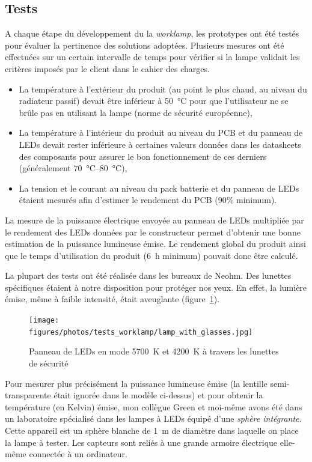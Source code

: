 \documentclass[a4paper, 12pt, sffamily]{report}
\begin{document}
\subsection{Tests}
A chaque étape du développement du la \emph{worklamp}, les prototypes ont été testés pour évaluer la pertinence des solutions adoptées. Plusieurs mesures ont été effectuées sur un certain intervalle de temps pour vérifier si la lampe validait les critères imposés par le client dans le cahier des charges.
\begin{itemize} %
\item La température à l'extérieur du produit (au point le plus chaud, au niveau du radiateur passif) devait être inférieur à \SI{50}{\celsius} pour que l'utilisateur ne se brûle pas en utilisant la lampe (norme de sécurité européenne),
\item La température à l'intérieur du produit au niveau du PCB et du panneau de LEDs devait rester inférieure à certaines valeurs données dans les datasheets des composants pour assurer le bon fonctionnement de ces derniers (généralement \SIrange{70}{80}{\celsius}),
\item La tension et le courant au niveau du pack batterie et du panneau de LEDs étaient mesurés afin d'estimer le rendement du PCB (90\% minimum).
\end{itemize}
La mesure de la puissance électrique envoyée au panneau de LEDs multipliée par le rendement des LEDs données par le constructeur permet d'obtenir une bonne estimation de la puissance lumineuse émise. Le rendement global du produit ainsi que le temps d'utilisation du produit (\SI{6}{\hour} minimum) pouvait donc être calculé.

La plupart des tests ont été réalisée dans les bureaux de Neohm. Des lunettes spécifiques étaient à notre disposition pour protéger nos yeux. En effet, la lumière émise, même à faible intensité, était aveuglante (figure~\ref{fig:lamp_with_glasses}).

\begin{figure}[h]
\centering
\texttt{[image: figures/photos/tests\_worklamp/lamp\_with\_glasses.jpg]}
\caption{Panneau de LEDs en mode \SI{5700}{\kelvin} et \SI{4200}{\kelvin} à travers les lunettes de sécurité}
\label{fig:lamp_with_glasses}
\end{figure}

Pour mesurer plus précisément la puissance lumineuse émise (la lentille semi-transparente était ignorée dans le modèle ci-dessus) et pour obtenir la température (en Kelvin) émise, mon collègue Green et moi-même avons été dans un laboratoire spécialisé dans les lampes à LEDs équipé d'une \emph{sphère intégrante}. Cette appareil est un sphère blanche de \SI{1}{\meter} de diamètre dans laquelle on place la lampe à tester. Les capteurs sont reliés à une grande armoire électrique elle-même connectée à un ordinateur.
\end{document}
